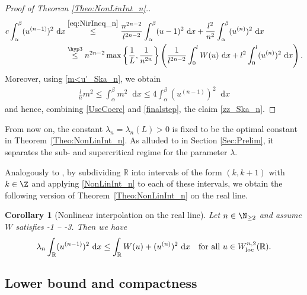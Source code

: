 \documentclass{article}
\newcommand{\dd}{\mathop{}\mathrm{d}} %
\newcommand{\lam}{\lambda}
\numberwithin{figure}{section}
\newcommand{\R}{\mathbb{R}}
\newtheorem{cor}[theorem]{Corollary}
\numberwithin{equation}{section}
\begin{document}
\begin{proof}[Proof of Theorem \ref{Theo:NonLinInt_n}.]
        \setlength\jot{0.5cm}
        \begin{align} \label{UseCoerc}
        \begin{split}
            c \int_\alpha^\beta (u^{(n-1)})^2\dd x 
            & \overset{\eqref{eq:NirIneq_n}}{\leq} \frac {n^{2n-2}}{l^{2n-2}} \int_\alpha^\beta (u-1)^2\dd x + \frac {l^2}{n^2} \int_\alpha^\beta (u^{(n)})^2\dd x\\
            & \overset{\hyp3}{\leq} n^{2n-2} \max\left\{\frac 1L,\frac 1{n^{2n}}\right\} \left(\frac {1}{l^{2n-2}}  \int_0^l  W(u)\dd x + l^2  \int_0^l(u^{(n)})^2\dd x\right).
        \end{split}
        \end{align}
    Moreover, using \eqref{m<u'_Ska_n}, we obtain 
        \begin{align} \label{finalstep}
            \frac {l}{n} m^2 \leq \int_\alpha^\beta m^2\dd x \leq 4 \int_\alpha^\beta (u^{(n-1)})^2\dd x
        \end{align}
    and hence, combining \eqref{UseCoerc} and \eqref{finalstep}, the claim \eqref{zz_Ska_n}.
\end{proof}

From now on, the constant $\lam_n = \lam_n(L)>0$ is fixed to be the optimal constant in Theorem~\ref{Theo:NonLinInt_n}. As alluded to in Section \ref{Sec:Prelim}, it separates the sub- and supercritical regime for the parameter $\lam$.

Analogously to \cite[Remark~3.2]{CicSpaZep}, by subdividing $\R$ into intervals of the form $(k,k+1)$ with $k \in \Z$ and applying \eqref{NonLinInt_n} to each of these intervals, we obtain the following version of Theorem~\ref{Theo:NonLinInt_n} on the real line.

\begin{cor}[Nonlinear interpolation on the real line] \label{corNonLinInt_R}
Let $n \in \N_{\geq2}$ and assume $W$ satisfies \hyp1 -- \hyp3. Then we have
    \begin{align} \label{NonLinInt_R}
        \lam_n \int_\R (u^{(n-1)})^2\dd x \leq \int_\R W(u)+(u^{(n)})^2\dd x    && \text{for all } u \in W^{n,2}_{\rm loc}(\R).
    \end{align}
\end{cor}



\subsection{Lower bound and compactness} \label{Subsec:LowBound}
\end{document}
